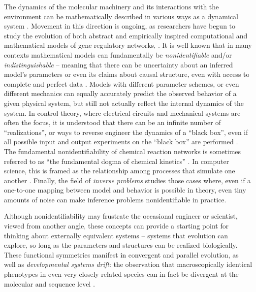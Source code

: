 \documentclass{article}
\newcommand{\1}{\mathbbm{1}}
\begin{document}
The dynamics of the molecular machinery and its interactions with the environment
can be mathematically described in various ways as a dynamical system \citep{jaeger2015comet}.
Movement in this direction is ongoing, as researchers have begun to study 
the evolution of both abstract \citep{wagner1994evolution, wagner1996does, siegal2002waddington, bergman2003evolutionary, draghi2015robustness} 
and empirically inspired computational and mathematical models of gene regulatory networks,
\citep[e.g.][]{mjolsness1991connectionist, jaeger2004dynamic, maria1, vitaly1, vitaly2, crombach2016gap, wotton2015quantitative, chertkova2017insilico}.
It is well known that in many contexts mathematical models
can fundamentally be \emph{nonidentifiable} and/or \emph{indistinguishable} -- meaning that 
there can be uncertainty about an inferred model's parameters or even its claims about
causal structure, even with access to complete and perfect data \citep{bellman1970structural, grewal1976identifiability, walter1984structural}. 
Models with different parameter schemes, or even different mechanics 
can equally accurately predict the observed behavior of a given physical system, 
but still not actually reflect the internal dynamics of the system.
In control theory, where electrical circuits and mechanical systems are often the focus, 
it is understood that there can be an infinite number of ``realizations'', 
or ways to reverse engineer the dynamics of a ``black box'',
even if all possible input and output experiments on the ``black box'' are performed 
\citep{kalman1963mathematical, anderson1966equivalence, zadeh1976linear}. 
The fundamental nonidentifiability of chemical reaction networks is sometimes referred to as ``the fundamental dogma of chemical kinetics'' \citep{craciun2008identifiability}. 
In computer science, this is framed as the relationship among processes that simulate one another \citep{van2004equivalence}.
Finally,
the field of \emph{inverse problems} studies those cases where,
even if a one-to-one mapping between model and behavior is possible in theory,
even tiny amounts of noise can make inference problems nonidentifiable in practice.

Although nonidentifiability may frustrate the occasional engineer or scientist, viewed from another angle,
these concepts can provide a starting point for thinking about externally equivalent systems
-- systems that evolution can explore, so long as the parameters and structures can be realized biologically.
These functional symmetries manifest in convergent and parallel evolution, 
as well as \emph{developmental systems drift}: the observation that
macroscopically identical phenotypes in even very closely related species can in fact be divergent at the molecular and sequence level 
\citep{true2001developmental, tanay2005conservation, tsong2006evolution, hare2008sepsid, vierstra2014mouse,  dalal2016transcriptional, dalal2017transcription}.
\end{document}
